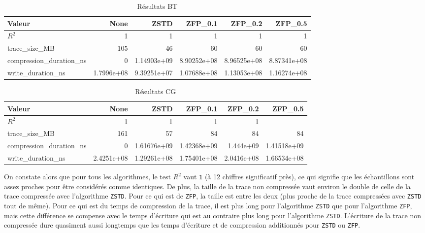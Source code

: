 \begin{table}[h]
\centering
\caption{Résultats BT}\label{bt}
\begin{adjustbox}{max width=\linewidth}
\begin{tabular}{lrrrrr}
\hline
\textbf{Valeur} & \textbf{None} & \textbf{ZSTD} & \textbf{ZFP\_0.1} & \textbf{ZFP\_0.2} & \textbf{ZFP\_0.5} \\
\hline
$R^2$                     & 1           & 1           & 1            & 1            & 1 \\
trace\_size\_MB           & 105         & 46          & 60           & 60           & 60 \\
compression\_duration\_ns & 0           & 1.14903e+09 & 8.90252e+08  & 8.96525e+08  & 8.87341e+08 \\
write\_duration\_ns       & 1.7996e+08  & 9.39251e+07 & 1.07688e+08  & 1.13053e+08  & 1.16274e+08 \\
\hline
\end{tabular}
\end{adjustbox}
\end{table}

\begin{table}[h]
\centering
\caption{Résultats CG}\label{cg}
\begin{adjustbox}{max width=\linewidth}
\begin{tabular}{lrrrrr}
\hline
\textbf{Valeur} & \textbf{None} & \textbf{ZSTD} & \textbf{ZFP\_0.1} & \textbf{ZFP\_0.2} & \textbf{ZFP\_0.5} \\
\hline
$R^2$                     & 1           & 1           & 1            & 1            &  \\
trace\_size\_MB           & 161         & 57          & 84           & 84           & 84 \\
compression\_duration\_ns & 0           & 1.61676e+09 & 1.42368e+09  & 1.444e+09    & 1.41518e+09 \\
write\_duration\_ns       & 2.4251e+08  & 1.29261e+08 & 1.75401e+08  & 2.0416e+08   & 1.66534e+08 \\
\hline
\end{tabular}
\end{adjustbox}
\end{table}

On constate alors que pour tous les algorithmes, le test $R^2$ vaut \verb!1! (à 12 chiffres significatif près), ce qui signifie que les échantillons sont assez proches pour être considérés comme identiques.
De plus, la taille de la trace non compressée vaut environ le double de celle de la trace compressée avec l'algorithme \verb!ZSTD!. Pour ce qui est de \verb!ZFP!, la taille est entre les deux (plus proche 
de la trace compressées avec \verb!ZSTD! tout de même).
Pour ce qui est du temps de compression de la trace, il est plus long pour l'algorithme \verb!ZSTD! que pour l'algorithme \verb!ZFP!, mais cette différence se compense avec le
temps d'écriture qui est au contraire plus long pour l'algorithme \verb!ZSTD!. L'écriture de la trace non compressée dure quasiment aussi longtemps que les temps d'écriture et de 
compression additionnés pour \verb!ZSTD! ou \verb!ZFP!.

